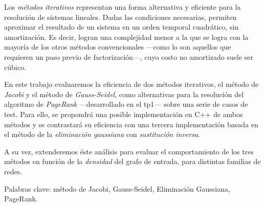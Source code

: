Los \textit{métodos iterativos} representan una forma alternativa y eficiente para la resolución de sistemas lineales. Dadas las condiciones necesarias, permiten aproximar el resultado de un sistema en un orden temporal cuadrático, sin amortización. Es decir, logran una complejidad  menor a la que se logra con la mayoría de los otros métodos convencionales ---como lo son aquellos que requieren un paso previo de factorización---, cuyo costo no amortizado suele ser cúbico.

\vspace{1em}
En este trabajo evaluaremos la eficiencia de dos métodos iterativos, el método de \textit{Jacobi} y el método de \textit{Gauss-Seidel}, como alternativas para la resolución del algoritmo de \textit{PageRank} ---desarrollado en el tp1--- sobre una serie de casos de test. Para ello, se propondrá una posible implementación en C++ de ambos métodos y se contrastará su eficiencia con una tercera implementación basada en el método de la \textit{eliminación gaussiana} con \textit{sustitución inversa}.

A su vez, extenderemos éste análisis para evaluar el comportamiento de los tres métodos en función de la \textit{densidad} del grafo de entrada, para distintas familias de redes. 

\vspace{1em}
\noindent Palabras clave: método de Jacobi, Gauss-Seidel, Eliminación Gaussiana, PageRank.
